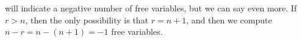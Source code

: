  will indicate a negative number of free variables, but we can say even more.  If $r>n$, then the only possibility is that $r=n+1$, and then we compute $n-r=n-(n+1)=-1$ free variables.